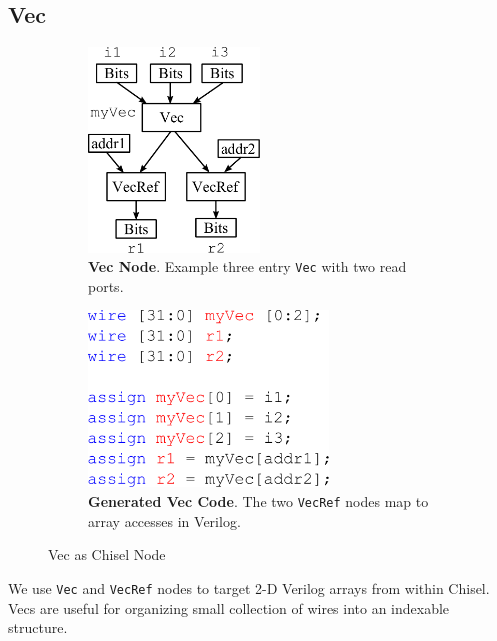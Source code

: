 \subsection{Vec}
\begin{figure}[hb]
\centering
  \begin{subfigure}[t]{0.48\textwidth}
  \centering
  \includegraphics[width=0.5\textwidth]{figures/vecnode.pdf}
  \caption{{\bf Vec Node}. Example three entry {\tt Vec} with two
    read ports.}
  \label{fig:vecnode}
  \end{subfigure}
  \hfill
  \begin{subfigure}[t]{0.48\textwidth}
  \centering
  \includegraphics[width=0.7\textwidth]{figures/vecv.pdf}
  \caption{{\bf Generated Vec Code}. The two {\tt VecRef} nodes map to
  array accesses in Verilog.}
  \label{fig:vecv}
  \end{subfigure}
\caption{Vec as Chisel Node}
\label{fig:vec}
\end{figure}

We use {\tt Vec} and {\tt VecRef} nodes to target 2-D Verilog arrays
from within Chisel. Vecs are useful for organizing small collection of
wires into an indexable structure.

